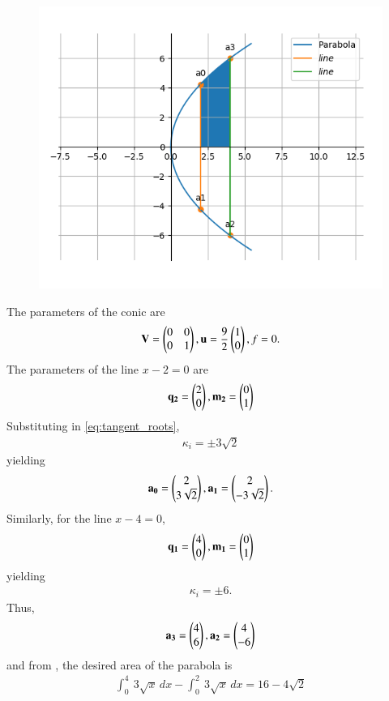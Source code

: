 	\begin{figure}[!h]
		\centering
 \includegraphics[width=\columnwidth]{chapters/12/8/1/2/figs/conics1.png}
		\caption{}
		\label{fig:12/8/1/2}
  	\end{figure}
The parameters of the conic are
\begin{align}
 \mathbf{V} = \begin{pmatrix}0 & 0\\0 & 1\end{pmatrix},
	\mathbf{u} = \frac{9}{2}\begin{pmatrix}1 \\0\end{pmatrix},
 f = 0.
\end{align}
The parameters of 
the line $x-2=0$ are
\begin{align}
\mathbf{q_2}=\begin{pmatrix}2\\0\end{pmatrix},
\mathbf{m_2}=\begin{pmatrix}0\\1\end{pmatrix}
\end{align}
Substituting in 
\eqref{eq:tangent_roots},
\begin{align}
\kappa_i=\pm 3\sqrt{2}
\end{align}
yielding
\begin{align}
\mathbf{a_0}=\begin{pmatrix}2\\3\sqrt{2}\end{pmatrix},
\mathbf{a_1}=\begin{pmatrix}2\\-3\sqrt{2}\end{pmatrix}.
\end{align}
Similarly, 
for the line $x-4=0$,
\begin{align}
\mathbf{q_1}=\begin{pmatrix}4\\0\end{pmatrix},
\mathbf{m_1}=\begin{pmatrix}0\\1\end{pmatrix}
\end{align}
yielding
\begin{align}
\kappa_i=\pm 6.
\end{align}
Thus, 
\begin{align}
\mathbf{a_3}=\begin{pmatrix}4\\6\end{pmatrix},
\mathbf{a_2}=\begin{pmatrix}4\\-6\end{pmatrix}
\end{align}
and 
		from ,
the 
desired area of the parabola is
\begin{align}
\int_{0}^{4} \ 3\sqrt{x} \,dx-\int_{0}^{2} \ 3\sqrt{x} \,dx
=16-4\sqrt{2}
\end{align}
